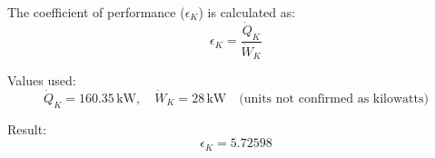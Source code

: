 The coefficient of performance (\( \epsilon_K \)) is calculated as:  
\[
\epsilon_K = \frac{\dot{Q}_K}{\dot{W}_K}
\]

Values used:  
\[
\dot{Q}_K = 160.35 \, \text{kW}, \quad \dot{W}_K = 28 \, \text{kW} \quad \text{(units not confirmed as kilowatts)}
\]

Result:  
\[
\epsilon_K = 5.72598
\]
